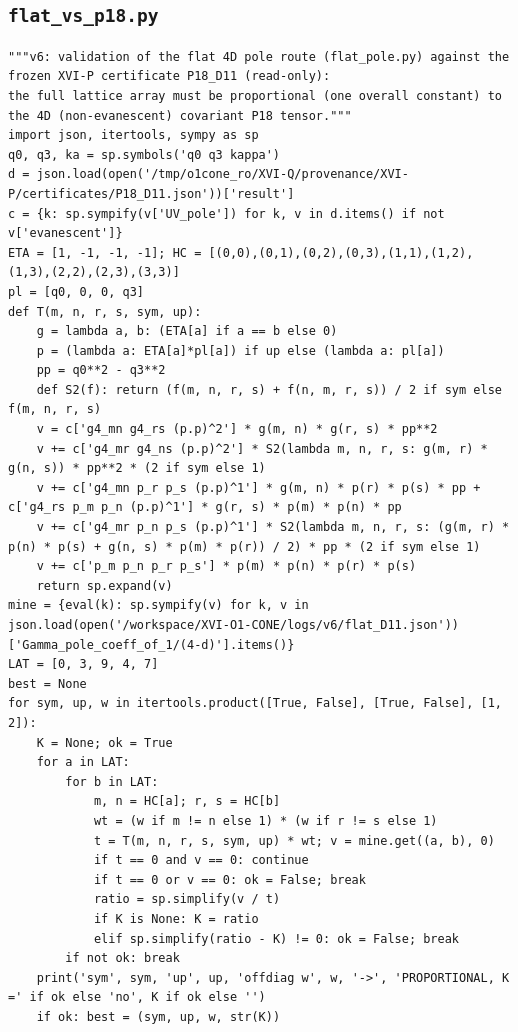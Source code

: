 \documentclass[10pt]{article}
\begin{document}
\subsection{\texttt{flat\_vs\_p18.py}}
\begin{lstlisting}
"""v6: validation of the flat 4D pole route (flat_pole.py) against the frozen XVI-P certificate P18_D11 (read-only):
the full lattice array must be proportional (one overall constant) to the 4D (non-evanescent) covariant P18 tensor."""
import json, itertools, sympy as sp
q0, q3, ka = sp.symbols('q0 q3 kappa')
d = json.load(open('/tmp/o1cone_ro/XVI-Q/provenance/XVI-P/certificates/P18_D11.json'))['result']
c = {k: sp.sympify(v['UV_pole']) for k, v in d.items() if not v['evanescent']}
ETA = [1, -1, -1, -1]; HC = [(0,0),(0,1),(0,2),(0,3),(1,1),(1,2),(1,3),(2,2),(2,3),(3,3)]
pl = [q0, 0, 0, q3]
def T(m, n, r, s, sym, up):
    g = lambda a, b: (ETA[a] if a == b else 0)
    p = (lambda a: ETA[a]*pl[a]) if up else (lambda a: pl[a])
    pp = q0**2 - q3**2
    def S2(f): return (f(m, n, r, s) + f(n, m, r, s)) / 2 if sym else f(m, n, r, s)
    v = c['g4_mn g4_rs (p.p)^2'] * g(m, n) * g(r, s) * pp**2
    v += c['g4_mr g4_ns (p.p)^2'] * S2(lambda m, n, r, s: g(m, r) * g(n, s)) * pp**2 * (2 if sym else 1)
    v += c['g4_mn p_r p_s (p.p)^1'] * g(m, n) * p(r) * p(s) * pp + c['g4_rs p_m p_n (p.p)^1'] * g(r, s) * p(m) * p(n) * pp
    v += c['g4_mr p_n p_s (p.p)^1'] * S2(lambda m, n, r, s: (g(m, r) * p(n) * p(s) + g(n, s) * p(m) * p(r)) / 2) * pp * (2 if sym else 1)
    v += c['p_m p_n p_r p_s'] * p(m) * p(n) * p(r) * p(s)
    return sp.expand(v)
mine = {eval(k): sp.sympify(v) for k, v in json.load(open('/workspace/XVI-O1-CONE/logs/v6/flat_D11.json'))['Gamma_pole_coeff_of_1/(4-d)'].items()}
LAT = [0, 3, 9, 4, 7]
best = None
for sym, up, w in itertools.product([True, False], [True, False], [1, 2]):
    K = None; ok = True
    for a in LAT:
        for b in LAT:
            m, n = HC[a]; r, s = HC[b]
            wt = (w if m != n else 1) * (w if r != s else 1)
            t = T(m, n, r, s, sym, up) * wt; v = mine.get((a, b), 0)
            if t == 0 and v == 0: continue
            if t == 0 or v == 0: ok = False; break
            ratio = sp.simplify(v / t)
            if K is None: K = ratio
            elif sp.simplify(ratio - K) != 0: ok = False; break
        if not ok: break
    print('sym', sym, 'up', up, 'offdiag w', w, '->', 'PROPORTIONAL, K =' if ok else 'no', K if ok else '')
    if ok: best = (sym, up, w, str(K))

\end{lstlisting}
\end{document}
